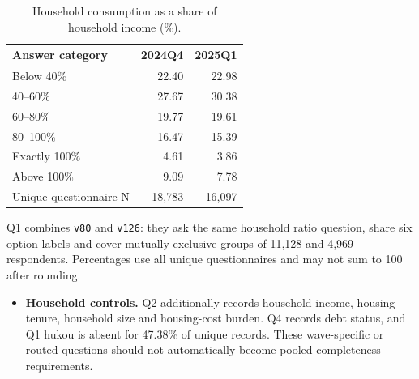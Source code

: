 \documentclass[11pt,letterpaper,english,final]{article}
\begin{document}
\begin{table}[H]
\centering\small
\setlength{\tabcolsep}{5pt}
\caption{Household consumption as a share of household income (\%).}
\begin{tabular}{lrr}
\toprule
Answer category & 2024Q4 & 2025Q1 \\
\midrule
Below 40\% & 22.40 & 22.98 \\
40--60\% & 27.67 & 30.38 \\
60--80\% & 19.77 & 19.61 \\
80--100\% & 16.47 & 15.39 \\
Exactly 100\% & 4.61 & 3.86 \\
Above 100\% & 9.09 & 7.78 \\
\midrule
Unique questionnaire N & 18,783 & 16,097 \\
\bottomrule
\end{tabular}
\par\vspace{4pt}\begin{minipage}{\linewidth}\footnotesize Q1 combines \texttt{v80} and \texttt{v126}: they ask the same household ratio question, share six option labels and cover mutually exclusive groups of 11,128 and 4,969 respondents. Percentages use all unique questionnaires and may not sum to 100 after rounding.\end{minipage}
\end{table}
\begin{itemize}[nosep]
\item \textbf{Household controls.} Q2 additionally records household income, housing tenure, household size and housing-cost burden. Q4 records debt status, and Q1 hukou is absent for 47.38\% of unique records. These wave-specific or routed questions should not automatically become pooled completeness requirements.
\end{itemize}
\end{document}
